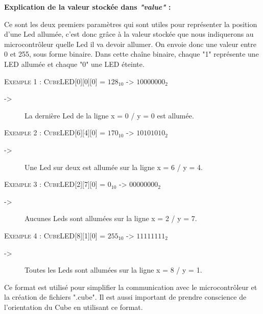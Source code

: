 \documentclass[a4paper,12pt]{article}
\begin{document}
\vspace{1.5cm} 

\textbf{\large{Explication de la valeur stockée dans \emph{"value"} :}}

\noindent Ce sont les deux premiers paramètres qui sont utiles pour représenter la position d'une Led allumée, c'est donc grâce à la valeur stockée que nous indiquerons au microcontrôleur quelle Led il va devoir allumer. On envoie donc une valeur entre 0 et 255, sous forme binaire. Dans cette chaîne binaire, chaque "1" représente une LED allumée et chaque "0" une LED éteinte.
\vspace{1cm} 

\noindent \textsc{Exemple 1 : CubeLED}[0][0][0] = $128_{10}$ -> $10000000_2$ 
\begin{description}
	\item[->]La dernière Led de la ligne x = 0 / y = 0 est allumée.\\
\end{description}

\noindent \textsc{Exemple 2 : CubeLED}[6][4][0] = $170_{10}$ -> $10101010_2$ 
\begin{description}
	\item[->]Une Led sur deux est allumée sur la ligne x = 6 / y = 4.\\
\end{description}

\noindent \textsc{Exemple 3 : CubeLED}[2][7][0] = $0_{10}$ -> $00000000_2$ 
\begin{description}
	\item[->]Aucunes Leds sont allumées sur la ligne x = 2 / y = 7.\\
\end{description}

\noindent \textsc{Exemple 4 : CubeLED}[8][1][0] = $255_{10}$ -> $11111111_2$ 
\begin{description}
	\item[->]Toutes les Leds sont allumées sur la ligne x = 8 / y = 1.\\
\end{description}


\newpage

\noindent Ce format est utilisé pour simplifier la communication avec le microcontrôleur et la création de fichiers ".cube". Il est aussi important de prendre conscience de l’orientation du Cube en utilisant ce format.

\vspace{0.5cm}
\end{document}
